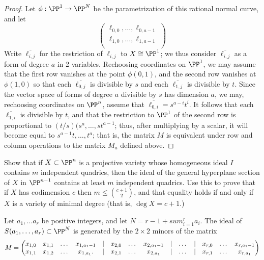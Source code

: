 \begin{proof}
Let $\phi: \PP^{1}\to \PP^{N}$ be the parametrization of this rational normal curve, and let
$$
\begin{pmatrix}
 \ell_{0,0},\dots, \ell_{0,a-1}\\
  \ell_{1,0},\dots, \ell_{1,a-1}\\
\end{pmatrix}
$$
 Write $\overline{\ell_{i,j}}$ for the restriction of $\ell_{i,j}$ to $X \cong \PP^{1}$; we thus consider
  $\overline{\ell_{i,j}}$ as a form of degree $a$ in 2 variables. 
 Rechoosing coordinates on $\PP^{1}$, we may assume that the first row vanishes at the point $\phi(0,1)$, and the second row vanishes at $\phi(1,0)$ so that each $\overline{\ell_{0,j}}$ is divisible by $s$ and each $\overline{\ell_{1,j}}$ is divisible by $t$. Since the vector space of forms of degree $a$ divisible by $s$ has dimension $a$, we may, rechoosing coordinates on $\PP^{n}$, assume that $\overline{\ell_{0,i}} = s^{a-i}t^{i}$. It follows that
each $\overline{\ell_{1,i}}$ is divisible by $t$, and that the restriction to $\PP^{1}$ of the second
row is proportional to $(t/s)(s^{a},\dots,st^{a-1}$; thus, after multiplying by a scalar, it will become
equal to $s^{a-1}t,\dots,t^{a}$; that is, the matrix $M$ is equivalent under row and column operations to the matrix $M_{a}$ defined above.
\end{proof}

\begin{exercise}
Show that if $X\subset \PP^n$ is a projective variety whose homogeneous ideal $I$ contains $m$ independent quadrics, then the ideal of the general hyperplane section of $X$ in $\PP^{n-1}$
contains at least $m$ independent quadrics. Use this to prove that if $X$ has codimension $c$ then $m\leq {c+1\choose 2}$, and that equality holds if and only if
$X$ is a variety of minimal degree (that is, $\deg X = c+1$.)
\end{exercise}

\begin{corollary}\label{equations of scrolls} Let $a_{1}, \dots a_{r}$ be positive integers, and let $N = r-1+sum_{i=1}^{r} a_{i}$.
The ideal of $S(a_{1},\dots,a_{r})\subset \PP^{N}$ is generated by the $2\times 2$ minors of the matrix
{\footnotesize
$$
\setcounter{MaxMatrixCols}{20}
M = \begin{pmatrix}
x_{1,0}&x_{1,1}&\dots&x_{1, a_{1}-1}&|&x_{2,0}&\dots&x_{2, a_{1}-1}&|&\dots&|&x_{r,0}&\dots&x_{r, a_{1}-1}\\
x_{1,1}&x_{1,2}&\dots&x_{1, a_{1}}.  &|&x_{2,1}&\dots&x_{2, a_{1}}&|&\dots&|&x_{r,1}&\dots&x_{r, a_{1}}
\end{pmatrix}
$$
}
\end{corollary}

